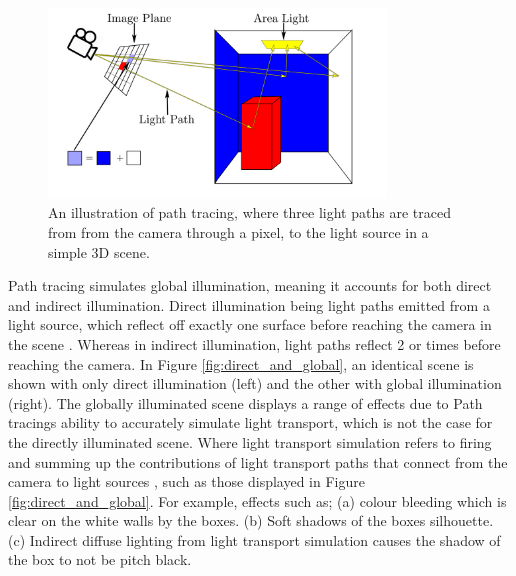 \documentclass[../dissertation.tex]{subfiles}
\begin{document}
\begin{figure}[h!]
\begin{center}
\includegraphics[width=0.8\textwidth]{images/path_tracing.png}    
\end{center}
\caption{An illustration of path tracing, where three light paths are traced from from the camera through a pixel, to the light source in a simple 3D scene.}
\label{fig:path_tracing_overview}
\end{figure}

Path tracing simulates global illumination, meaning it accounts for both direct and 
indirect illumination. Direct illumination being light paths emitted from a light 
source, which reflect off exactly one surface before reaching the camera in the 
scene . Whereas in indirect illumination, light paths reflect 2 or times before
reaching the camera. In Figure \ref{fig:direct_and_global}, an identical scene is shown with only direct illumination
(left) and the other with global illumination (right). The globally illuminated scene displays
a range of effects due to Path tracings ability to accurately simulate light transport, 
which is not the case for the directly illuminated scene. Where light transport simulation
refers to firing and summing up the contributions of light transport paths that connect from the
camera to light sources \cite{keller2016path}, such as those displayed in Figure \ref{fig:direct_and_global}. For 
example, effects such as; (a) colour bleeding which is clear on the white walls by the boxes. (b) Soft shadows of the boxes silhouette. (c) Indirect diffuse lighting
from light transport simulation causes the shadow of the box to not be pitch black.\\
\end{document}
